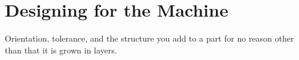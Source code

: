 
\chapter{Designing for the Machine}

 Orientation, tolerance, and the structure you add to
a part for no reason other than that it is grown in layers.

